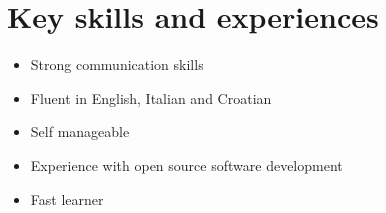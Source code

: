 \section*{Key skills and experiences}
\begin{itemize}
  \setlength\itemsep{0.1em}
  \item Strong communication skills
  \item Fluent in English, Italian and Croatian
  \item Self manageable
  \item Experience with open source software development
  \item Fast learner
\end{itemize}
